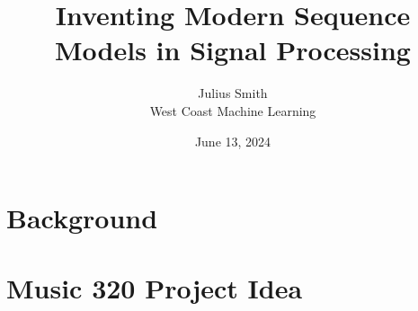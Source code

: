 
\newcommand{\theTitle}{Inventing Modern Sequence Models in Signal Processing}
\newcommand{\theEvent}{West Coast Machine Learning} 
\newcommand{\theDate}{June 13, 2024}


\newcommand{\theAuthor}{Julius Smith}


\usepackage{xcolor}

\usepackage{etoolbox} %
\newtoggle{local}
\togglefalse{local}


\date{\theDate}

\title{\theTitle}
\author{\theAuthor\\
  \theEvent
}



\maketitle

\section[\sectopts]{Background}




%

%

\section[\sectopts,toc={Basic Idea}]{Music 320 Project Idea}

